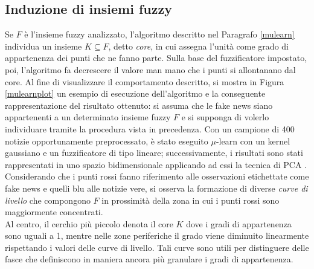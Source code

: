 \documentclass[12pt]{report}
\theoremstyle{definition}
\begin{document}
\subsection{Induzione di insiemi fuzzy}
Se $F$ è l'insieme fuzzy analizzato, l'algoritmo descritto nel Paragrafo \ref{mulearn} individua un insieme $K \subseteq F$, detto \textit{core}, in cui assegna l'unità come grado di appartenenza dei punti che ne fanno parte. Sulla base del fuzzificatore impostato, poi, l'algoritmo fa decrescere il valore man mano che i punti si allontanano dal core. 
Al fine di visualizzare il comportamento descritto, si mostra in Figura \ref{mulearnplot} un esempio di esecuzione dell'algoritmo e la conseguente rappresentazione del risultato ottenuto:
si assuma che le fake news siano appartenenti a un determinato insieme fuzzy $F$ e si supponga di volerlo individuare tramite la procedura vista in precedenza.
Con un campione di 400 notizie opportunamente preprocessato, è stato eseguito $\mu$-learn con un kernel gaussiano e un fuzzificatore di tipo lineare; successivamente, i risultati sono stati rappresentati in uno spazio bidimensionale applicando ad essi la tecnica di PCA \cite{30}.
\\
Considerando che i punti rossi fanno riferimento alle osservazioni etichettate come fake news e quelli blu alle notizie vere, si osserva la formazione di diverse \textit{curve di livello} che compongono $F$ in prossimità della zona in cui i punti rossi sono maggiormente concentrati.
\\
Al centro, il cerchio più piccolo denota il core $K$ dove i gradi di appartenenza sono uguali a 1, mentre nelle zone periferiche il grado viene diminuito linearmente rispettando i valori delle curve di livello. Tali curve sono utili per distinguere delle fasce che definiscono in maniera ancora più granulare i gradi di appartenenza.
\end{document}

